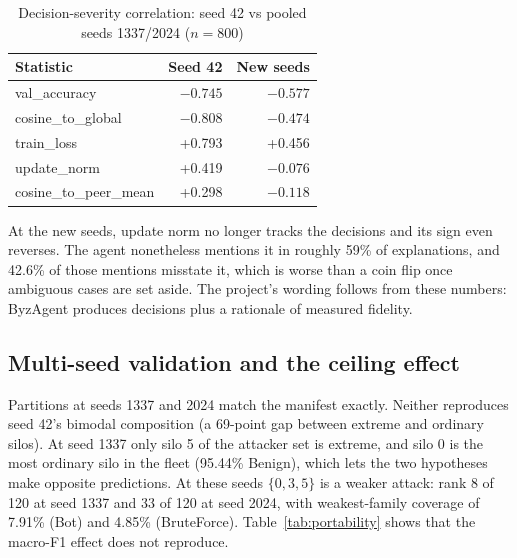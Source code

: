 \begin{table}[h]
\centering
\caption{Decision-severity correlation: seed 42 vs pooled seeds 1337/2024 ($n=800$)} %
\label{tab:fidelitynew}
\footnotesize
\begin{tabular}{@{}lrr@{}}
\toprule
Statistic & Seed 42 & New seeds\\ %
\midrule
val\_accuracy & $-0.745$ & $-0.577$\\ %
cosine\_to\_global & $-0.808$ & $-0.474$\\ %
train\_loss & +0.793 & +0.456\\ %
update\_norm & +0.419 & $-0.076$\\ %
cosine\_to\_peer\_mean & +0.298 & $-0.118$\\ %
\bottomrule
\end{tabular}
\end{table}

At the new seeds, update norm no longer tracks the decisions and its sign even reverses.
The agent nonetheless mentions it in roughly 59\% of explanations, and 42.6\% of those %
mentions misstate it, which is worse than a coin flip once ambiguous cases are set aside. The project's
wording follows from these numbers: ByzAgent produces decisions plus a rationale of
measured fidelity.

\subsection{Multi-seed validation and the ceiling effect}
Partitions at seeds 1337 and 2024 match the manifest exactly. Neither reproduces seed %
42's bimodal composition (a 69-point gap between extreme and ordinary silos). At seed %
1337 only silo 5 of the attacker set is extreme, and silo 0 is the most ordinary silo in %
the fleet (95.44\% Benign), which lets the two hypotheses make opposite predictions. At %
these seeds $\{0,3,5\}$ is a weaker attack: rank 8 of 120 at seed 1337 and 33 of 120 at %
seed 2024, with weakest-family coverage of 7.91\% (Bot) and 4.85\% (BruteForce). %
Table~\ref{tab:portability} shows that the macro-F1 effect does not reproduce.

